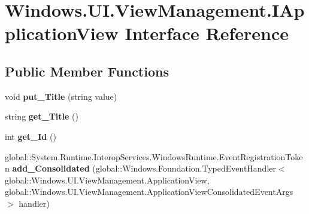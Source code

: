 \hypertarget{interface_windows_1_1_u_i_1_1_view_management_1_1_i_application_view}{}\section{Windows.\+U\+I.\+View\+Management.\+I\+Application\+View Interface Reference}
\label{interface_windows_1_1_u_i_1_1_view_management_1_1_i_application_view}
\subsection*{Public Member Functions}
\begin{DoxyCompactItemize}
\item 
\mbox{\label{interface_windows_1_1_u_i_1_1_view_management_1_1_i_application_view_a92d3277e8c30de745cb16c868d726dd6}} 
void {\bfseries put\+\_\+\+Title} (string value)
\item 
\mbox{\label{interface_windows_1_1_u_i_1_1_view_management_1_1_i_application_view_a8cf31a988ee9afab65de9ee57bad61ac}} 
string {\bfseries get\+\_\+\+Title} ()
\item 
\mbox{\label{interface_windows_1_1_u_i_1_1_view_management_1_1_i_application_view_a085241cde891f43041555e966151192b}} 
int {\bfseries get\+\_\+\+Id} ()
\item 
\mbox{\label{interface_windows_1_1_u_i_1_1_view_management_1_1_i_application_view_ab9e4087fb6ff5d554c2307d00530d07b}} 
global\+::\+System.\+Runtime.\+Interop\+Services.\+Windows\+Runtime.\+Event\+Registration\+Token {\bfseries add\+\_\+\+Consolidated} (global\+::\+Windows.\+Foundation.\+Typed\+Event\+Handler$<$ global\+::\+Windows.\+U\+I.\+View\+Management.\+Application\+View, global\+::\+Windows.\+U\+I.\+View\+Management.\+Application\+View\+Consolidated\+Event\+Args $>$ handler)
\item 
\mbox{\label{interface_windows_1_1_u_i_1_1_view_management_1_1_i_application_view_af6ab836962164e5617ab1386c2e02849}} 

\end{DoxyCompactItemize}
